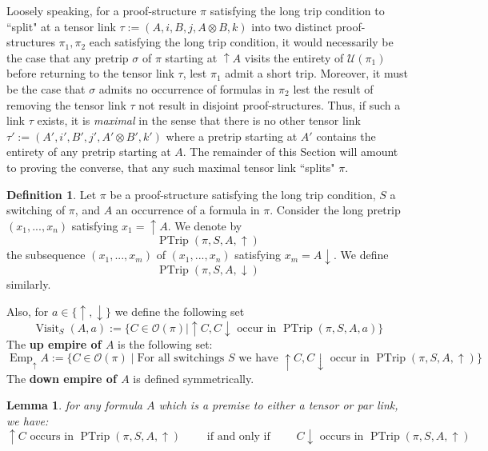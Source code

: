 \documentclass[12pt]{article}
\theoremstyle{plain}
\newtheorem{lemma}[thm]{Lemma}
\theoremstyle{definition}
\newtheorem{defn}[thm]{Definition} %
\newcommand{\call}[1]{\mathcal{#1}}
\begin{document}
Loosely speaking, for a proof-structure $\pi$ satisfying the long trip condition to ``split" at a tensor link $\tau := (A,i,B,j,A\otimes B,k)$ into two distinct proof-structures $\pi_1,\pi_2$ each satisfying the long trip condition, it would necessarily be the case that any pretrip $\sigma$ of $\pi$ starting at $\uparrow A$ visits the entirety of $\call{U}(\pi_1)$ before returning to the tensor link $\tau$, lest $\pi_1$ admit a short trip. Moreover, it must be the case that $\sigma$ admits no occurrence of formulas in $\pi_2$ lest the result of removing the tensor link $\tau$ not result in disjoint proof-structures. Thus, if such a link $\tau$ exists, it is \emph{maximal} in the sense that there is no other tensor link $\tau' := (A',i',B',j',A' \otimes B',k')$ where a pretrip starting at $A'$ contains the entirety of any pretrip starting at $A$. The remainder of this Section will amount to proving the converse, that any such maximal tensor link ``splits" $\pi$.
\begin{defn}\label{def:pretrip_from_A}
Let $\pi$ be a proof-structure satisfying the long trip condition, $S$ a switching of $\pi$, and $A$ an occurrence of a formula in $\pi$. Consider the long pretrip $(x_1,...,x_n)$ satisfying $x_1 = \uparrow A$. We denote by
\begin{equation}
    \operatorname{PTrip}(\pi,S,A,\uparrow)
\end{equation}
the subsequence $(x_1,...,x_m)$ of $(x_1,...,x_n)$ satisfying $x_m = A\downarrow$. We define
\begin{equation}
    \operatorname{PTrip}(\pi, S, A, \downarrow)
\end{equation}
similarly.

Also, for $a \in \lbrace \uparrow,\downarrow\rbrace $ we define the following set
\begin{equation}
    \operatorname{Visit}_S(A,a) := \lbrace C \in \call{O}(\pi) \mid \uparrow C, C\downarrow \text{ occur in } \operatorname{PTrip}(\pi,S,A,a)\rbrace
\end{equation}
The \textbf{up empire of $A$} is the following set:
\begin{equation}
    \operatorname{Emp}_{\uparrow}A := \lbrace C \in \call{O}(\pi) \mid \text{For all switchings }S\text{ we have } \uparrow C, C\downarrow \text{ occur in } \operatorname{PTrip}(\pi,S, A,\uparrow)\rbrace
\end{equation}
The \textbf{down empire of $A$} is defined symmetrically.
\end{defn}
\begin{lemma}
for any formula $A$ which is a premise to either a tensor or par link, we have: $$\uparrow C \text{ occurs in } \operatorname{PTrip}(\pi,S,A,\uparrow)\qquad\text{ if and only if }\qquad C\downarrow \text{ occurs in } \operatorname{PTrip}(\pi,S,A,\uparrow)$$
\end{lemma}
\end{document}
